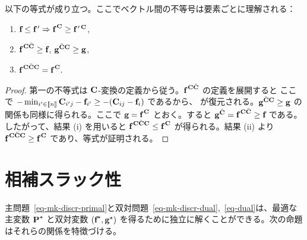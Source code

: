 \begin{prop}\label{prop-ccc-2}以下の等式が成り立つ。ここでベクトル間の不等号は要素ごとに理解される：
	\begin{enumerate}[label=(\roman*)]
	\item $\fD\leq \fD\,' \Rightarrow \fD^{\,\C}\geq \fD\,'^{\,\C}$,
	\item $\fD^{\,\C\bar{\C}} \geq \fD$, $\gD^{\bar{\C}\C} \geq \gD$,
	\item $\fD^{\,\C\bar{\C}\C}=\fD^{\,\C}.$
\end{enumerate}
\end{prop}
\begin{proof} 第一の不等式は $\C$-変換の定義から従う。$\fD^{\,\C\bar{\C}}$ の定義を展開すると
ここで $-\min_{i'\in \range{n}} \C_{i'j}-\fD_{i'} \geq -(\C_{ij}-\fD_i)$ であるから、
が復元される。$\gD^{\bar{\C}\C} \geq \gD$ の関係も同様に得られる。ここで $\gD=\fD^{\,\C}$ とおく。すると $\gD^{\bar{\C}}=\fD^{\,\C\bar{\C}}\geq \fD$ である。したがって、結果 (i) を用いると $\fD^{\,\C\bar{\C}\C}\leq \fD^{\,\C}$ が得られる。結果 (ii) より $\fD^{\,\C\bar{\C}\C}\geq \fD^{\,\C}$ であり、等式が証明される。
\end{proof}


\section{相補スラック性}\label{s-complementary}

主問題~\eqref{eq-mk-discr-primal}と双対問題~\eqref{eq-mk-discr-dual},~\eqref{eq-dual}は、最適な主変数 $\P^{\star}$ と双対変数 $(\fD^{\star},\gD^{\star})$ を得るために独立に解くことができる。次の命題はそれらの関係を特徴づける。

